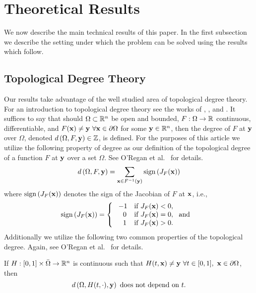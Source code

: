 \section{Theoretical Results} \label{sec:theory}  
We now describe the main technical results of this paper. 
In the first subsection we describe the setting under which the problem can be solved using the results which follow. 
\subsection{Topological Degree Theory}
Our results take advantage of the well studied area of topological degree theory. 
For an introduction to topological degree theory see the works of \cite{fonseca1995degree}, \cite{MoVrYa2002}, and \cite{OrChCh2006}.
It suffices to say that should $\Omega\subset\mathbb{R}^{n}$ be open and bounded, $F:\Omega\rightarrow \mathbb{R}$ continuous, differentiable, and $F(\mathbf{x}) \neq \mathbf{y}~\forall \mathbf{x}\in\partial\Omega$ for some $\mathbf{y}\in\mathbb{R}^n$, then the degree of $F$ at $\mathbf{y}$ over $\Omega$, denoted $d\left(\Omega,F,\mathbf{y}\right)\in\mathbb{Z}$, is defined. 
For the purposes of this article we utilize the following property of degree as our definition of the topological degree of a function $F$ at $\mathbf{y}$ over a set $\Omega$. 
See O'Regan et al.~\cite{OrChCh2006} for details.
\begin{equation}\label{eq:Deg3}
  d\left(\Omega,F,\mathbf{y}\right)=\sum\limits_{\mathbf{x}\in F^{-1}(\mathbf{y})}\operatorname{sign}\left(J_F(\mathbf{x})\right)
\end{equation}
%
where $\operatorname{sign}\left(J_F(\mathbf{x})\right)$ denotes the sign of the Jacobian of $F$ at $\mathbf{x}$, i.e.,
%
\[\operatorname{sign}\left(J_F(\mathbf{x})\right)=   \left\{
\begin{array}{ll}
       \ -1   & \mbox{if } J_F(\mathbf{x})< 0, \\
      \quad 0 & \mbox{if } J_F(\mathbf{x})= 0,~\mbox{ and } \\
      \quad 1 & \mbox{if } J_F(\mathbf{x})> 0. \\
\end{array} 
\right. \]
%
Additionally we utilize the following two common properties of the topological degree. 
Again, see O'Regan et al.~\cite{OrChCh2006} for details. 

If $H : [0,1]\times\bar{\Omega}\rightarrow\mathbb{R}^n$ is continuous such that $H(t,\mathbf{x})\neq \mathbf{y}~\forall t\in[0,1],~\mathbf{x}\in\partial\Omega$,  then 
\begin{equation}\label{eq:Deg1} 
  d\left(\Omega,H(t,\cdot),\mathbf{y}\right)\text{ does not depend on }t.
\end{equation}


